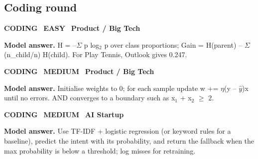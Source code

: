 \documentclass[11pt]{article}
\begin{document}
\subsection*{\color{navyL}Coding round}
\begin{tcolorbox}[enhanced,breakable,colback=white,colframe=navyL,arc=2mm,boxrule=0.8pt,left=3mm,right=3mm,
 title={\textbf{QV.06}\quad Compute entropy and information gain for a split from scratch.},fonttitle=\color{white}\small,colbacktitle=navyL]
\colorbox{navyL!15}{\scriptsize\bfseries\color{navyL} CODING}\
\colorbox{leaf!15}{\scriptsize\bfseries\color{leaf} EASY}\
\colorbox{navy!8}{\scriptsize\bfseries\color{navy} Product / Big Tech}\par\smallskip
\textbf{\color{navy}Model answer.} H = --$\Sigma$ p log$_2$ p over class proportions; Gain = H(parent) -- $\Sigma$ (n\_child/n) H(child). For Play Tennis, Outlook gives 0.247.
\end{tcolorbox}
\begin{tcolorbox}[enhanced,breakable,colback=white,colframe=navyL,arc=2mm,boxrule=0.8pt,left=3mm,right=3mm,
 title={\textbf{QV.07}\quad Train a perceptron for AND/OR and print the final weights.},fonttitle=\color{white}\small,colbacktitle=navyL]
\colorbox{navyL!15}{\scriptsize\bfseries\color{navyL} CODING}\
\colorbox{gold!85!black!15}{\scriptsize\bfseries\color{gold!85!black} MEDIUM}\
\colorbox{navy!8}{\scriptsize\bfseries\color{navy} Product / Big Tech}\par\smallskip
\textbf{\color{navy}Model answer.} Initialise weights to 0; for each sample update w += $\eta$(y -- $\hat y$)x until no errors. AND converges to a boundary such as x$_1$ + x$_2$ $\ge$ 2.
\end{tcolorbox}
\begin{tcolorbox}[enhanced,breakable,colback=white,colframe=navyL,arc=2mm,boxrule=0.8pt,left=3mm,right=3mm,
 title={\textbf{QV.08}\quad Write an intent classifier for a chatbot with a fallback.},fonttitle=\color{white}\small,colbacktitle=navyL]
\colorbox{navyL!15}{\scriptsize\bfseries\color{navyL} CODING}\
\colorbox{gold!85!black!15}{\scriptsize\bfseries\color{gold!85!black} MEDIUM}\
\colorbox{navy!8}{\scriptsize\bfseries\color{navy} AI Startup}\par\smallskip
\textbf{\color{navy}Model answer.} Use TF-IDF + logistic regression (or keyword rules for a baseline), predict the intent with its probability, and return the fallback when the max probability is below a threshold; log misses for retraining.
\end{tcolorbox}
\end{document}
